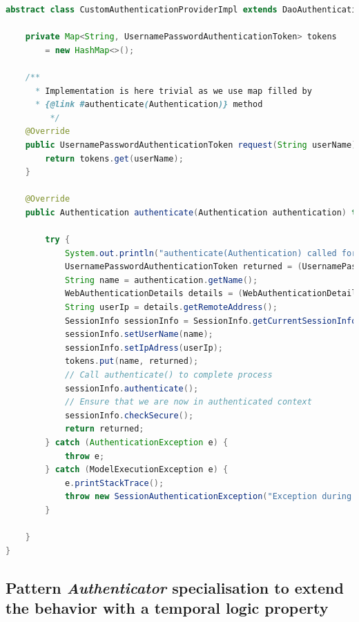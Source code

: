 \begin{lstlisting}[language=Java,basicstyle=\ttfamily\footnotesize, caption=Authentication management with \texttt{CustomAuthenticationProvider} definition,label=listing:CustomAuthenticationProviderImpl]
abstract class CustomAuthenticationProviderImpl extends DaoAuthenticationProvider implements CustomAuthenticationProvider {

    private Map<String, UsernamePasswordAuthenticationToken> tokens 
        = new HashMap<>();
        
	/**
      * Implementation is here trivial as we use map filled by
      * {@link #authenticate(Authentication)} method
		 */
	@Override
	public UsernamePasswordAuthenticationToken request(String userName) {
		return tokens.get(userName);
	}

	@Override
	public Authentication authenticate(Authentication authentication) throws AuthenticationException {

		try {
			System.out.println("authenticate(Authentication) called for " + authentication);
			UsernamePasswordAuthenticationToken returned = (UsernamePasswordAuthenticationToken) super.authenticate(authentication);
			String name = authentication.getName();
			WebAuthenticationDetails details = (WebAuthenticationDetails) authentication.getDetails();
			String userIp = details.getRemoteAddress();
			SessionInfo sessionInfo = SessionInfo.getCurrentSessionInfo();
			sessionInfo.setUserName(name);
			sessionInfo.setIpAdress(userIp);
			tokens.put(name, returned);
			// Call authenticate() to complete process
			sessionInfo.authenticate();
			// Ensure that we are now in authenticated context
			sessionInfo.checkSecure();
			return returned;
		} catch (AuthenticationException e) {
			throw e;
		} catch (ModelExecutionException e) {
			e.printStackTrace();
			throw new SessionAuthenticationException("Exception during authentication: " + e.getMessage());
        }

	}
}
\end{lstlisting}


\subsection{Pattern \textit{Authenticator} specialisation to extend the behavior with a temporal logic property}






